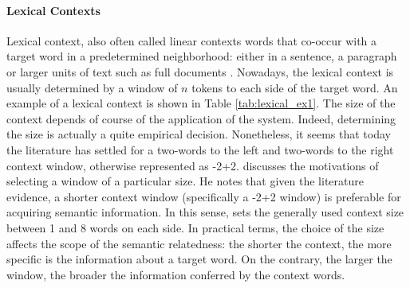 \paragraph{Lexical Contexts}
Lexical context, also often called linear contexts  words that co-occur with a target word in a predetermined neighborhood: either in a sentence, a paragraph or larger units of text such as full documents \cite{LevyG14,sahlgren2008distributional}. Nowadays, the lexical context is usually determined by a window of $n$ tokens to each side of the target word. An example of a lexical context is shown in Table \ref{tab:lexical_ex1}. The size of the context depends of course of the application of the system. Indeed, determining the size  is actually a quite empirical decision. Nonetheless, it seems that today the literature \cite{Daume2006,mikolov2013distributed,LevyG14,levy2014neural}  has settled for a two-words to the left and two-words to the right context window, otherwise represented as -2+2. \cite{sahlgren2006word} discusses  the motivations of selecting a window of a particular size. He notes that given the literature evidence,  a shorter context window (specifically a -2+2 window) is preferable for acquiring semantic information. In this sense, \cite{JurafskyM09} sets the generally used context size between 1 and 8 words on each side. In practical terms, the choice of the size  affects the scope of the semantic relatedness: the shorter the context, the more specific is the information about a target word. On the contrary, the larger the window, the broader the information conferred by the context words. 

